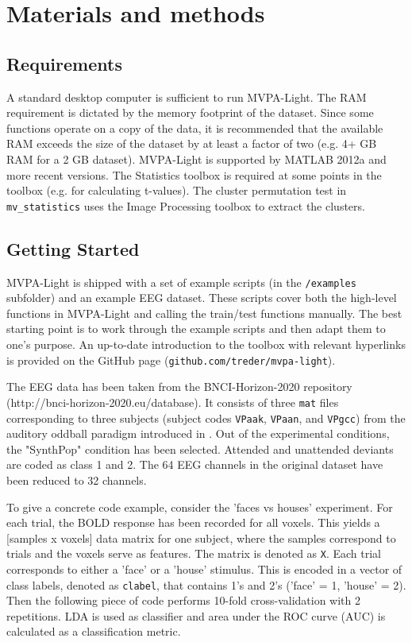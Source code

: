 \documentclass[utf8]{frontiersSCNS} %
\newcommand{\ttt}[1]{\texttt{#1}}
\begin{document}
\section{Materials and methods}

\subsection{Requirements}

A standard desktop computer is sufficient to run MVPA-Light. The RAM requirement is dictated by the memory footprint of the dataset. Since some functions operate on a copy of the data, it is recommended that the available RAM exceeds the size of the dataset by at least a factor of two (e.g. 4+ GB RAM for a 2 GB dataset). MVPA-Light is supported by MATLAB 2012a and more recent versions. The Statistics toolbox is required at some points in the toolbox (e.g. for calculating t-values). The cluster permutation test in \ttt{mv\_statistics} uses the Image Processing toolbox to extract the clusters.

\subsection{Getting Started}

MVPA-Light is shipped with a set of example scripts (in the \ttt{/examples} subfolder) and an example EEG dataset. These scripts cover both the high-level functions in MVPA-Light and calling the train/test functions manually. The best starting point is to work through the example scripts and then adapt them to one's purpose. An up-to-date introduction to the toolbox with relevant hyperlinks is provided on the GitHub page (\ttt{github.com/treder/mvpa-light}).

The EEG data has been taken from the BNCI-Horizon-2020 repository (http://bnci-horizon-2020.eu/database). It consists of three \ttt{mat} files corresponding to three subjects (subject codes \ttt{VPaak}, \ttt{VPaan}, and \ttt{VPgcc}) from the auditory oddball paradigm introduced in \cite{Treder2014}. Out of the experimental conditions, the "SynthPop" condition has been selected. Attended and unattended deviants are coded as class 1 and 2. The 64 EEG channels in the original dataset have been reduced to 32 channels.

To give a concrete code example, consider the 'faces vs houses' experiment. For each trial, the BOLD response has been recorded for all voxels. This yields a [samples x voxels] data matrix for one subject, where the samples correspond to trials and the voxels serve as features. The matrix is denoted as \ttt{X}. Each trial corresponds to either a 'face' or a 'house' stimulus. This is encoded in a vector of class labels, denoted as \ttt{clabel}, that contains 1's and 2's ('face' = 1, 'house' = 2). Then the following piece of code performs 10-fold cross-validation with 2 repetitions. LDA is used as classifier and area under the ROC curve (AUC) is calculated as a classification metric.
\end{document}
